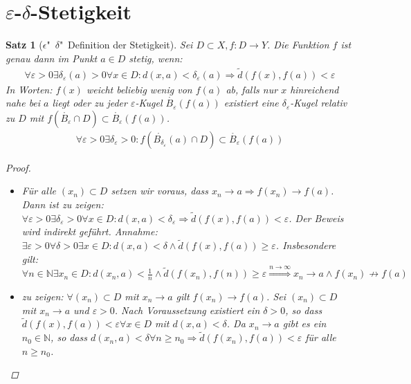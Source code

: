 \documentclass[ngerman,titlepage,twoside, parskip=half*]{scrreprt}
\newcommand*{\N}{\mathbb{N}}
\theoremstyle{break}
\newtheorem{theorem}{Satz}[section]
\theoremstyle{nonumberbreak}
\newtheorem{proof}{Beweis:}
\begin{document}
\section{\texorpdfstring{$\varepsilon$-$\delta$}{Epsilon-Delta}-Stetigkeit}
\begin{theorem}[$\epsilon$"~$\delta$"~Definition der Stetigkeit]\label{satz:e-d-stetig}
  Sei $D\subset X, f\colon D\rightarrow Y$. Die Funktion $f$ ist genau dann im
  Punkt $a\in D$ stetig, wenn:
  \begin{gather*}
    \forall \varepsilon >0 \exists \delta_{\varepsilon}(a)>0 \forall x \in
       D\colon d(x,a)<\delta_{\varepsilon} (a)\Rightarrow
       \tilde{d}(f(x),f(a))<\varepsilon
  \end{gather*}
  In Worten: $f(x)$ weicht beliebig wenig von $f(a)$ ab, falls nur $x$
  hinreichend nahe bei $a$ liegt oder zu jeder $\varepsilon$-Kugel
  $\mathring{B_{\varepsilon}}(f(a))$ existiert eine
  $\delta_{\varepsilon}$-Kugel relativ zu $D$ mit
  $f(\mathring{B_{\varepsilon}}\cap D)\subset \mathring{B_{\varepsilon}}
  (f(a))$.
  \begin{gather*}
    \forall \varepsilon >0 \exists \delta_{\varepsilon}>0\colon
       f(\mathring{B_{\delta_{\varepsilon}}}(a) \cap D) \subset
       \mathring{B_{\varepsilon}}(f(a))
  \end{gather*}
  \begin{proof}
    \begin{itemize}
  \item["`$\Rightarrow$"'] Für alle $(x_n)\subset D$ setzen wir voraus, dass
      $x_n\rightarrow a \Rightarrow f(x_n)\rightarrow f(a)$. Dann  ist
    zu zeigen: $\forall \varepsilon >0 \exists \delta_{\varepsilon} >0 \forall
      x \in D\colon d(x,a)< \delta_{\varepsilon}\Rightarrow
      \tilde{d}(f(x),f(a))<\varepsilon$.
    Der Beweis wird indirekt geführt. Annahme: $\exists \varepsilon >0 \forall
      \delta >0 \exists x \in D\colon d(x,a)<\delta \wedge \tilde{d}
      (f(x),f(a))\geq \varepsilon$.
    Insbesondere gilt: $\forall n \in \N \exists x_n \in D\colon d(x_n,a)<\frac{1}{n} \wedge \tilde{d}(f(x_n),
    f(n))\geq \varepsilon \stackrel{n\rightarrow \infty}{\Longrightarrow} x_n \rightarrow a \wedge 
    f(x_n)\not\rightarrow f(a)$
   \lightning
  \item["`$\Leftarrow$"'] zu zeigen: $\forall (x_n) \subset D$ mit
      $x_n\rightarrow a$ gilt $f(x_n) \rightarrow f(a)$.
    Sei $(x_n)\subset D$ mit $x_n\rightarrow a$ und $\varepsilon >0$. Nach
      Voraussetzung existiert ein $\delta >0$, so dass
      $\tilde{d}(f(x),f(a))<\varepsilon \forall x \in D$ mit $d(x,a)<\delta$.
      Da $x_n\rightarrow a$ gibt es ein $n_0\in \N$, so dass $d(x_n,a)<\delta
      \forall n\geq n_0 \Rightarrow \tilde{d}(f(x_n),f(a))<\varepsilon$ für
      alle $n\geq n_0$.
\end{itemize}
  \end{proof}
\end{theorem}
\end{document}
